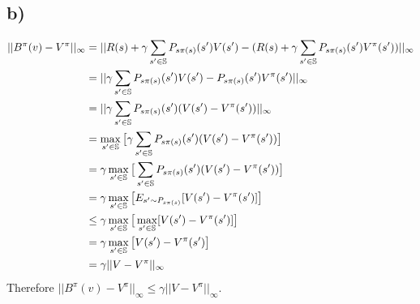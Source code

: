 \documentclass[11pt]{article}
\begin{document}
\subsection*{b)}
\begin{align*}
    ||B^{\pi}(v) - V^{\pi}||_{\infty} &= ||R(s) + \gamma \sum_{s' \in \mathbb{S}} P_{s \pi(s)}(s') V(s') - (R(s) + \gamma \sum_{s' \in \mathbb{S}} P_{s \pi(s)}(s') V^{\pi}(s')) ||_{\infty} \\
                                    &= ||\gamma \sum_{s' \in \mathbb{S}} P_{s \pi(s)}(s') V(s') - P_{s \pi(s)}(s') V^{\pi}(s') ||_{\infty} \\
                                    &= ||\gamma \sum_{s' \in \mathbb{S}} P_{s \pi(s)}(s') (V(s') - V^{\pi}(s')) ||_{\infty} \\
                                    &= \max_{s' \in \mathbb{S}} \big[ \gamma \sum_{s' \in \mathbb{S}} P_{s \pi(s)}(s') (V(s') - V^{\pi}(s')) \big] \\
                                    &= \gamma \max_{s' \in \mathbb{S}} \big[ \sum_{s' \in \mathbb{S}} P_{s \pi(s)}(s') (V(s') - V^{\pi}(s')) \big] \\
                                    &= \gamma \max_{s' \in \mathbb{S}} \big[ E_{s' \sim P_{s \pi(s)}}[V(s') - V^{\pi}(s')] \big] \\
                                    &\le \gamma \max_{s' \in \mathbb{S}} \big[ \max_{s' \in \mathbb{S}}[V(s') - V^{\pi}(s')] \big] \\
                                    &= \gamma \max_{s' \in \mathbb{S}} \big[ V(s') - V^{\pi}(s') \big] \\
                                    &= \gamma || V - V^{\pi} ||_{\infty} \\
\end{align*}
Therefore $||B^{\pi}(v) - V^{\pi}||_{\infty} \le \gamma || V - V^{\pi} ||_{\infty}$. \\
\end{document}
